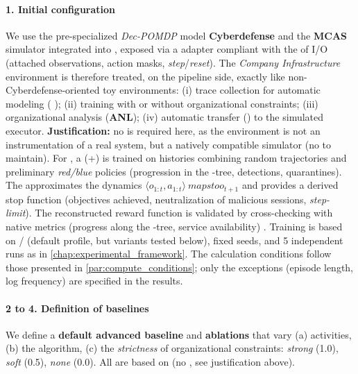 \paragraph{1. Initial configuration}

We use the pre-specialized \emph{Dec-POMDP} model \textbf{Cyberdefense} and the \textbf{MCAS} simulator integrated into , exposed via a  adapter compliant with the  of I/O  (attached observations, action masks, \emph{step}/\emph{reset}). The \emph{Company Infrastructure} environment is therefore treated, on the pipeline side, exactly like non-Cyberdefense-oriented toy environments: (i) trace collection for automatic modeling ( ); (ii)  training with or without organizational constraints; (iii) organizational analysis (\textbf{ANL}); (iv) automatic transfer () to the simulated executor.
\textbf{Justification:} no  is required here, as the environment is not an instrumentation of a real system, but a natively compatible simulator (no  to maintain).
For , a  (+) is trained on histories combining random trajectories and preliminary \emph{red/blue} policies (progression in the -tree, detections, quarantines). The  approximates the dynamics $\langle o_{1:t},a_{1:t} \rangle \ mapsto o_{t+1}$ and provides a derived stop function (objectives achieved, neutralization of malicious sessions, \emph{step-limit}). The reconstructed reward function is validated by cross-checking with native metrics (progress along the -tree, service availability) . Training is based on / (default  profile, but variants tested below), fixed seeds, and 5 independent runs as in \autoref{chap:experimental_framework}. The calculation conditions follow those presented in \autoref{par:compute_conditions}; only the exceptions (episode length, log frequency) are specified in the results.

\paragraph{2 to 4. Definition of baselines}

We define a \textbf{default advanced baseline} and \textbf{ablations} that vary (a)  activities, (b) the  algorithm, (c) the \emph{strictness} of organizational constraints: \emph{strong} (1.0), \emph{soft} (0.5), \emph{none} (0.0). All are based on  (no , see justification above).

